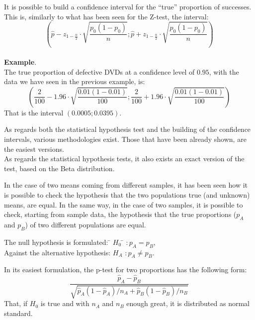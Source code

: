 \begin{frame}
  \vspace{0.25cm}
  It is possible to build a confidence interval for the ``true'' proportion of successes. This is, similarly to what has been seen for the Z-test, the interval:
  $$ \left( \hat{p} - z_{1-\frac{\alpha}{2}} \cdot \sqrt{\frac{p_0 (1-p_0)}{n}}; \hat{p} + z_{1-\frac{\alpha}{2}} \cdot \sqrt{\frac{p_0 (1-p_0)}{n}} \right) $$\\
  \vspace{0.25cm}
  \textbf{Example}.\\
  The true proportion of defective DVDs at a confidence level of $ 0.95 $, with the data we have seen in the previous example, is:
  $$ \left( \frac{2}{100} - 1.96 \cdot \sqrt{\frac{0.01 (1-0.01)}{100}}; \frac{2}{100} + 1.96 \cdot \sqrt{\frac{0.01 (1-0.01)}{100}} \right) $$
  That is the interval $ \left(0.0005; 0.0395\right) $.
\end{frame}

\begin{frame}
  \vspace{0.5cm}
  As regards both the statistical hypothesis test and the building of the confidence intervals, various methodologies exist. Those that have been already shown, are the easiest versions.\\
  \vspace{0.5cm}
  As regards the statistical hypothesis tests, it also exists an exact version of the test, based on the Beta distribution.
\end{frame}


\begin{frame}
  In the case of two means coming from different samples, it has been seen how it is possible to check the hypothesis that the two populations true (and unknown) means, are equal. In the same way, in the case of two samples, it is possible to check, starting from sample data, the hypothesis that the true proportions ($ p_A $ and $ p_B $) of two different populations are equal.\\
  \vspace{-.5cm}
  \begin{tabbing}
    The null hypothesis is formulated: \=  $ H_0 $ \= $ :  p_A = p_B $,\\
    Against the alternative hypothesis: \>  $ H_A $ \> $ :  p_A \neq p_B $.\\
  \end{tabbing}
  \vspace{-.5cm}
  In its easiest formulation, the p-test for two proportions has the following form:
  $$ \frac{\hat{p}_A - \hat{p}_B}{\sqrt{\hat{p}_A (1 - \hat{p}_A) / n_A + \hat{p}_B (1 - \hat{p}_B) / n_B}} $$
  That, if $ H_0 $ is true and with $ n_A $ and $ n_B $ enough great, it is distributed as normal standard.
\end{frame}

